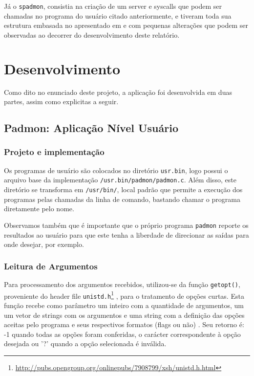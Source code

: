 \documentclass[12pt,journal,compsoc]{IEEEtran}
\begin{document}
Já o \texttt{spadmon}, consistia na criação de um server e syscalls que podem ser chamadas no programa do usuário citado anteriormente, e tiveram toda sua estrutura embasada no apresentado em \cite{service_tutorial:Heabuh} e \cite{criar_kernel_call:wikiMinix3} com pequenas alterações que podem ser observadas ao decorrer do desenvolvimento deste relatório.

\section{Desenvolvimento}
Como dito no enunciado deste projeto, a aplicação foi desenvolvida em duas partes, assim como explicitas a seguir.
\subsection{Padmon: Aplicação Nível Usuário}

\subsubsection{Projeto e implementação}

Os programas de usuário são colocados no diretório \texttt{usr.bin}, logo possui o arquivo base da implementação \texttt{/usr.bin/padmon/padmon.c}. Além disso, este diretório se transforma em \texttt{/usr/bin/}, local padrão que permite a execução dos programas pelas chamadas da linha de comando, bastando chamar o programa diretamente pelo nome.

Observamos também que é importante que o próprio programa \texttt{padmon} reporte os resultados ao usuário para que este tenha a liberdade de direcionar as saídas para onde desejar, por exemplo.

\subsubsection{Leitura de Argumentos}
Para processamento dos argumentos recebidos, utilizou-se da função \texttt{getopt()}, proveniente do header file \texttt{unistd.h}\footnote{\url{http://pubs.opengroup.org/onlinepubs/7908799/xsh/unistd.h.html}}
, para o tratamento de opções curtas. Esta função recebe como parâmetro um inteiro com a quantidade de argumentos, um um vetor de strings com os argumentos e uma string com a definição das opções aceitas pelo programa e seus respectivos formatos (flags ou não) \cite{getopt:DaemoioLabs}. Seu retorno é: -1 quando todas as opções foram conferidas, o carácter correspondente à opção desejada ou '?' quando a opção selecionada é inválida.
\end{document}
